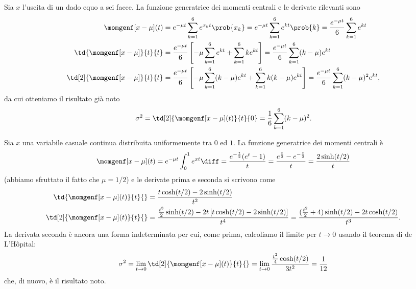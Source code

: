 \begin{examplebox}
  \begin{example}
    Sia $x$ l'uscita di un dado equo a sei facce. La funzione generatrice dei
    momenti centrali e le derivate rilevanti sono
    \begin{align*}
      \momgenf[x - \mu](t) &= e^{-\mu t} \sum_{k = 1}^{6} e^{x_kt} \prob{x_k} =
      e^{-\mu t} \sum_{k = 1}^{6} e^{kt} \prob{k} =
      \frac{e^{-\mu t}}{6} \sum_{k = 1}^{6} e^{kt}\\
      \td{\momgenf[x - \mu]}{t}{t} & =
      \frac{e^{-\mu t}}{6} \left[-\mu  \sum_{k = 1}^{6} e^{kt} +
        \sum_{k = 1}^{6} ke^{kt} \right] = 
      \frac{e^{-\mu t}}{6} \sum_{k = 1}^{6} (k - \mu) e^{kt}\\
      \td[2]{\momgenf[x - \mu]}{t}{t} & = 
      \frac{e^{-\mu t}}{6} \left[ -\mu \sum_{k = 1}^{6} (k - \mu) e^{kt}
        + \sum_{k = 1}^{6} k(k - \mu)  e^{kt} \right] = 
      \frac{e^{-\mu t}}{6} \sum_{k = 1}^{6} (k - \mu)^2 e^{kt},
    \end{align*}
    da cui otteniamo il risultato già noto
    \begin{align*}
      \sigma^2 = \td[2]{\momgenf[x - \mu](t)}{t}{0} = 
      \frac{1}{6}\sum_{k = 1}^{6} (k - \mu)^2.
    \end{align*}
  \end{example}

  \begin{example}
    Sia $x$ una variabile casuale continua distribuita uniformemente tra $0$ ed
    $1$. La funzione generatrice dei momenti centrali è
    \begin{align*}
      \momgenf[x - \mu](t) = e^{-\mu t} \int_{0}^{1}e^{xt} \diff =
      \frac{e^{-\frac{t}{2}} (e^t - 1)}{t} =
      \frac{e^{\frac{t}{2}} - e^{-\frac{t}{2}}}{t} = 
      \frac{2\sinh(t/2)}{t}
    \end{align*}
    (abbiamo sfruttato il fatto che $\mu = 1/2$) e le derivate prima e seconda
    si scrivono come
    \begin{align*}
      \td{\momgenf[x - \mu](t)}{t}{} & =
      \frac{t\cosh(t/2) - 2\sinh(t/2)}{t^2}\\
      \td[2]{\momgenf[x - \mu](t)}{t}{} & = 
      \frac{\frac{t^3}{2}\sinh(t/2) -
        2t\left[t\cosh(t/2) - 2\sinh(t/2)\right]}{t^4} =
       \frac{(\frac{t^2}{2} + 4)\sinh(t/2) - 2t\cosh(t/2) }{t^3}.
    \end{align*}
    La derivata seconda è ancora una forma indeterminata per cui, come prima,
    calcoliamo il limite per $t \rightarrow 0$ usando il teorema di
    de L'H\^opital:
    \begin{align*}
      \sigma^2 = \lim_{t \rightarrow 0} \td[2]{\momgenf[x - \mu](t)}{t}{} = 
      \lim_{t \rightarrow 0} \frac{\frac{t^2}{4}\cosh(t/2)}{3t^2} = \frac{1}{12}
    \end{align*}
    che, di nuovo, è il risultato noto.
  \end{example}
\end{examplebox}

